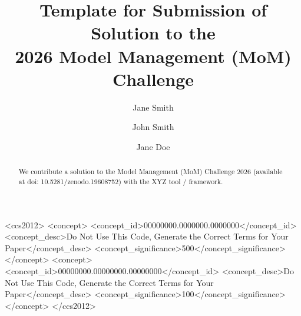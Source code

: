 \documentclass[sigconf]{acmart}
\begin{document}
\title{Template for Submission of Solution to the\\2026 Model Management (MoM) Challenge}

\author{Jane Smith}
\author{John Smith}
\authornotemark[1]

\author{Jane Doe}

\renewcommand{\shortauthors}{Smith, Smith \textit{et al.}}

\begin{abstract}
  We contribute a solution to the Model Management (MoM) Challenge 2026 
(available at doi: 10.5281/zenodo.19608752) with the XYZ tool / framework. 



\end{abstract}

\begin{CCSXML}
<ccs2012>
 <concept>
  <concept_id>00000000.0000000.0000000</concept_id>
  <concept_desc>Do Not Use This Code, Generate the Correct Terms for Your Paper</concept_desc>
  <concept_significance>500</concept_significance>
 </concept>
 <concept>
  <concept_id>00000000.00000000.00000000</concept_id>
  <concept_desc>Do Not Use This Code, Generate the Correct Terms for Your Paper</concept_desc>
  <concept_significance>100</concept_significance>
 </concept>
</ccs2012>
\end{CCSXML}
\end{document}
